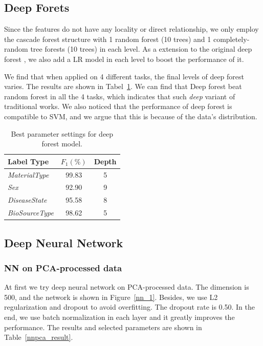 \documentclass[sigconf]{acmart}
\begin{document}
\subsection{Deep Forets}
Since the features do not have any locality or direct relationship, we only employ the cascade forest structure with 1 random forest (10 trees) and 1 completely-random tree forests (10 trees) in each level. As a extension to the original deep forest \cite{zhou2017deep}, we also add a LR model in each level to boost the performance of it. 

We find that when applied on 4 different tasks, the final levels of deep forest varies. The results are shown in Tabel~\ref{tab:DeepForest}. We can find that Deep forest beat random forest in all the 4 tasks, which indicates that such \textit{deep} variant of traditional works. We also noticed that the performance of deep forest is compatible to SVM, and we argue that this is because of the data's distribution.
\begin{table}[tbp]
	\centering
	\begin{tabular}{l|cc}
		\toprule
		{Label Type} & $F_1 (\%)$&Depth\\
		\midrule
		{\textit{MaterialType}}&99.83 &5\\
		{\textit{Sex}}		& 92.90  &9\\
		{\textit{DiseaseState}}& 95.58 &8 \\
		{\textit{BioSourceType}}& 98.62 &5\\
		\bottomrule	
	\end{tabular}
	\caption{Best parameter settings for deep forest model. }
	\label{tab:DeepForest}
\end{table}

\subsection{Deep Neural Network}

\subsubsection{ NN on PCA-processed data}
At first we try deep neural network on   PCA-processed data. The dimension is 500, and the network is shown in Figure~\ref{nn_1}. Besides,  we use L2 regularization and dropout to avoid overfitting. The dropout rate is 0.50. In the end, we use batch normalization in each layer and it greatly improves the performance. The results and selected parameters are shown in Table~\ref{nnpca_result}.
	
\end{document}
